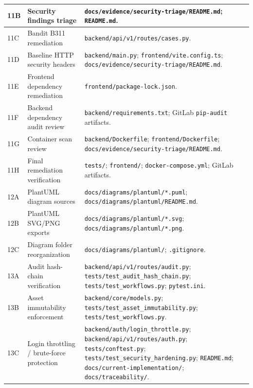 \documentclass[12pt,a4paper]{report}
\begin{document}
\begin{longtable}{|p{1.5cm}|p{4.8cm}|p{9.8cm}|}
11B & Security findings triage &
\texttt{docs/evidence/security-triage/README.md}; \texttt{README.md}. \\
\hline

11C & Bandit B311 remediation &
\texttt{backend/api/v1/routes/cases.py}. \\
\hline

11D & Baseline HTTP security headers &
\texttt{backend/main.py}; \texttt{frontend/vite.config.ts}; \texttt{docs/evidence/security-triage/README.md}. \\
\hline

11E & Frontend dependency remediation &
\texttt{frontend/package-lock.json}. \\
\hline

11F & Backend dependency audit review &
\texttt{backend/requirements.txt}; GitLab \texttt{pip-audit} artifacts. \\
\hline

11G & Container scan review &
\texttt{backend/Dockerfile}; \texttt{frontend/Dockerfile}; \texttt{docs/evidence/security-triage/README.md}. \\
\hline

11H & Final remediation verification &
\texttt{tests/}; \texttt{frontend/}; \texttt{docker-compose.yml}; GitLab artifacts. \\
\hline

12A & PlantUML diagram sources &
\texttt{docs/diagrams/plantuml/*.puml}; \texttt{docs/diagrams/plantuml/README.md}. \\
\hline

12B & PlantUML SVG/PNG exports &
\texttt{docs/diagrams/plantuml/*.svg}; \texttt{docs/diagrams/plantuml/*.png}. \\
\hline

12C & Diagram folder reorganization &
\texttt{docs/diagrams/plantuml/}; \texttt{.gitignore}. \\
\hline

13A & Audit hash-chain verification &
\texttt{backend/api/v1/routes/audit.py}; \texttt{tests/test\_audit\_hash\_chain.py}; \texttt{tests/test\_workflows.py}; \texttt{pytest.ini}. \\
\hline

13B & Asset immutability enforcement &
\texttt{backend/core/models.py}; \texttt{tests/test\_asset\_immutability.py}; \texttt{tests/test\_workflows.py}. \\
\hline

13C & Login throttling / brute-force protection &
\texttt{backend/auth/login\_throttle.py}; \texttt{backend/api/v1/routes/auth.py}; \texttt{tests/conftest.py}; \texttt{tests/test\_security\_hardening.py}; \texttt{README.md}; \texttt{docs/current-implementation/}; \texttt{docs/traceability/}. \\
\hline


\end{longtable}
\end{document}
